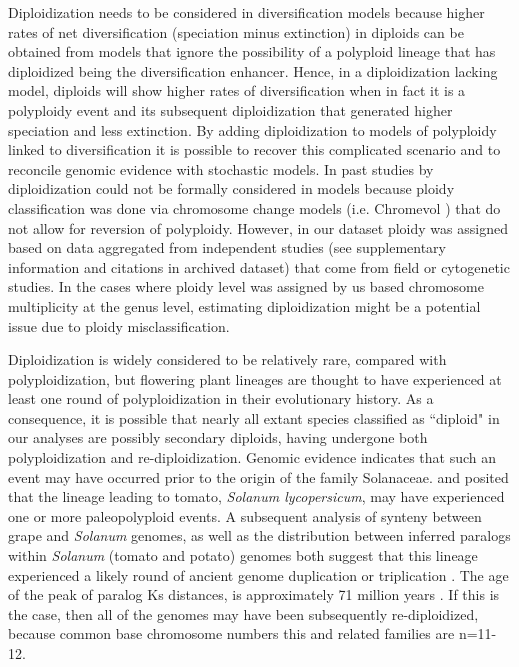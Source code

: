 Diploidization needs to be considered in diversification models because higher rates of net diversification (speciation minus extinction) in diploids can be obtained from models that ignore the possibility of a polyploid lineage that has diploidized being the diversification enhancer. Hence, in a diploidization lacking model, diploids will show higher rates of diversification when in fact it is a polyploidy event and its subsequent diploidization that generated higher speciation and less extinction.  By adding diploidization to models of polyploidy linked to diversification it is possible to recover this complicated scenario and to reconcile genomic evidence with stochastic models. In past studies by \citet{mayrose_2011, mayrose_2015} diploidization could not be formally  considered in models because ploidy classification was done via chromosome change models (i.e. Chromevol \citep{glick2014}) that do not allow for reversion of polyploidy. However, in our dataset ploidy was assigned based on data aggregated from independent studies (see supplementary information and citations in archived dataset) that come from field or cytogenetic studies. In the cases where ploidy level was assigned by us based chromosome multiplicity at the genus level, estimating diploidization  might be a potential issue due to ploidy misclassification.  

Diploidization is widely considered to be relatively rare, compared with polyploidization, but flowering plant lineages are thought to have experienced at least one round of polyploidization in their evolutionary history.
As a consequence, it is possible that nearly all extant species classified as ``diploid" in our analyses are possibly secondary diploids, having undergone both polyploidization and re-diploidization.
Genomic evidence indicates that such an event may have occurred prior to the origin of the family Solanaceae. 
\citet{ku2000} and \citet{blanc2004} posited that the lineage leading to tomato, \textit{Solanum lycopersicum}, may have experienced one or more paleopolyploid events.
A subsequent analysis of synteny between grape and \textit{Solanum} genomes, as well as the distribution between inferred paralogs within \textit{Solanum} (tomato and potato) genomes both suggest that this lineage experienced a likely round of ancient genome duplication or triplication \citep{tomato2012}. 
The age of the peak of paralog Ks distances, is approximately 71 million years \citep{tomato2012}. 
If this is the case, then all of the genomes may have been subsequently re-diploidized, because common base chromosome numbers this and related families are n=11-12. 

